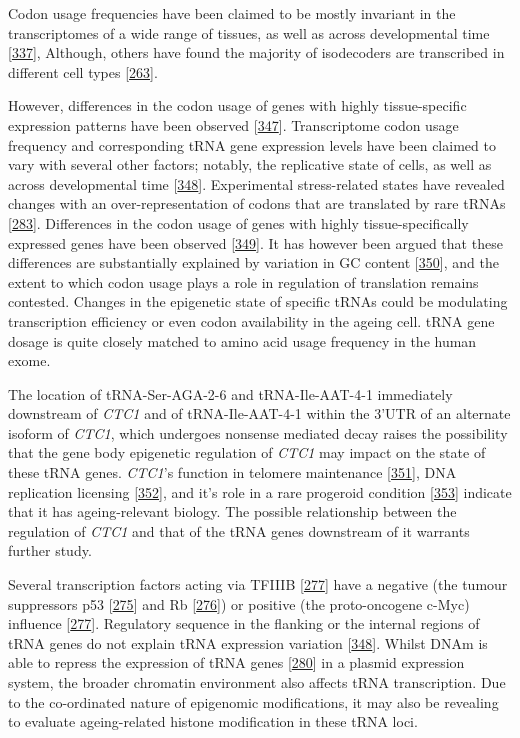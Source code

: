 \documentclass[
]{book}
\begin{document}
Codon usage frequencies have been claimed to be mostly invariant in the transcriptomes of a wide range of tissues, as well as across developmental time {[}\protect\hyperlink{ref-Schmitt2014b}{337}{]}, Although, others have found the majority of isodecoders are transcribed in different cell types {[}\protect\hyperlink{ref-Parisien2013}{263}{]}.

However, differences in the codon usage of genes with highly tissue-specific expression patterns have been observed {[}\protect\hyperlink{ref-Plotkin2004}{347}{]}.
Transcriptome codon usage frequency and corresponding tRNA gene expression levels have been claimed to vary with several other factors; notably, the replicative state of cells, as well as across developmental time {[}\protect\hyperlink{ref-Schmitt2014}{348}{]}.
Experimental stress-related states have revealed changes with an over-representation of codons that are translated by rare tRNAs {[}\protect\hyperlink{ref-Gingold2012}{283}{]}.
Differences in the codon usage of genes with highly tissue-specifically expressed genes have been observed {[}\protect\hyperlink{ref-Powell1997}{349}{]}.
It has however been argued that these differences are substantially explained by variation in GC content {[}\protect\hyperlink{ref-Rudolph2016}{350}{]}, and the extent to which codon usage plays a role in regulation of translation remains contested.
Changes in the epigenetic state of specific tRNAs could be modulating transcription efficiency or even codon availability in the ageing cell.
tRNA gene dosage is quite closely matched to amino acid usage frequency in the human exome.

The location of tRNA-Ser-AGA-2-6 and tRNA-Ile-AAT-4-1 immediately downstream of \emph{CTC1} and of tRNA-Ile-AAT-4-1 within the 3'UTR of an alternate isoform of \emph{CTC1}, which undergoes nonsense mediated decay raises the possibility that the gene body epigenetic regulation of \emph{CTC1} may impact on the state of these tRNA genes.
\emph{CTC1}'s function in telomere maintenance {[}\protect\hyperlink{ref-Gu2018}{351}{]}, DNA replication licensing {[}\protect\hyperlink{ref-Wang2019a}{352}{]}, and it's role in a rare progeroid condition {[}\protect\hyperlink{ref-Sargolzaeiaval2018}{353}{]} indicate that it has ageing-relevant biology. The possible relationship between the regulation of \emph{CTC1} and that of the tRNA genes downstream of it warrants further study.

Several transcription factors acting via TFIIIB {[}\protect\hyperlink{ref-Gomez-Roman2003}{277}{]} have a negative (the tumour suppressors p53 {[}\protect\hyperlink{ref-Crighton2003}{275}{]} and Rb {[}\protect\hyperlink{ref-Sutcliffe2000}{276}{]}) or positive (the proto-oncogene c-Myc) influence {[}\protect\hyperlink{ref-Gomez-Roman2003}{277}{]}.
Regulatory sequence in the flanking or the internal regions of tRNA genes do not explain tRNA expression variation {[}\protect\hyperlink{ref-Schmitt2014}{348}{]}.
Whilst DNAm is able to repress the expression of tRNA genes {[}\protect\hyperlink{ref-Besser1990}{280}{]} in a plasmid expression system, the broader chromatin environment also affects tRNA transcription.
Due to the co-ordinated nature of epigenomic modifications, it may also be revealing to evaluate ageing-related histone modification in these tRNA loci.
\end{document}
